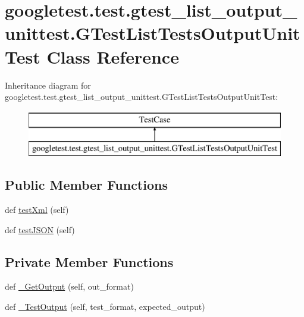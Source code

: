 \hypertarget{classgoogletest_1_1test_1_1gtest__list__output__unittest_1_1_g_test_list_tests_output_unit_test}{}\section{googletest.\+test.\+gtest\+\_\+list\+\_\+output\+\_\+unittest.\+G\+Test\+List\+Tests\+Output\+Unit\+Test Class Reference}
\label{classgoogletest_1_1test_1_1gtest__list__output__unittest_1_1_g_test_list_tests_output_unit_test}
Inheritance diagram for googletest.\+test.\+gtest\+\_\+list\+\_\+output\+\_\+unittest.\+G\+Test\+List\+Tests\+Output\+Unit\+Test\+:\begin{figure}[H]
\begin{center}
\leavevmode
\includegraphics[height=2.000000cm]{d6/d3b/classgoogletest_1_1test_1_1gtest__list__output__unittest_1_1_g_test_list_tests_output_unit_test}
\end{center}
\end{figure}
\subsection*{Public Member Functions}
\begin{DoxyCompactItemize}
\item 
def \mbox{\hyperlink{classgoogletest_1_1test_1_1gtest__list__output__unittest_1_1_g_test_list_tests_output_unit_test_ae179f4e10eba5dc6c220d9d8b9821fba}{test\+Xml}} (self)
\item 
def \mbox{\hyperlink{classgoogletest_1_1test_1_1gtest__list__output__unittest_1_1_g_test_list_tests_output_unit_test_adba004fc494581bf008417234d95f7ce}{test\+J\+S\+ON}} (self)
\end{DoxyCompactItemize}
\subsection*{Private Member Functions}
\begin{DoxyCompactItemize}
\item 
def \mbox{\hyperlink{classgoogletest_1_1test_1_1gtest__list__output__unittest_1_1_g_test_list_tests_output_unit_test_a78cbc5d3e1d12f96980c426a49027ffa}{\+\_\+\+Get\+Output}} (self, out\+\_\+format)
\item 
def \mbox{\hyperlink{classgoogletest_1_1test_1_1gtest__list__output__unittest_1_1_g_test_list_tests_output_unit_test_a5b8fdf4221a450277c1667a19b3ad502}{\+\_\+\+Test\+Output}} (self, test\+\_\+format, expected\+\_\+output)
\end{DoxyCompactItemize}


